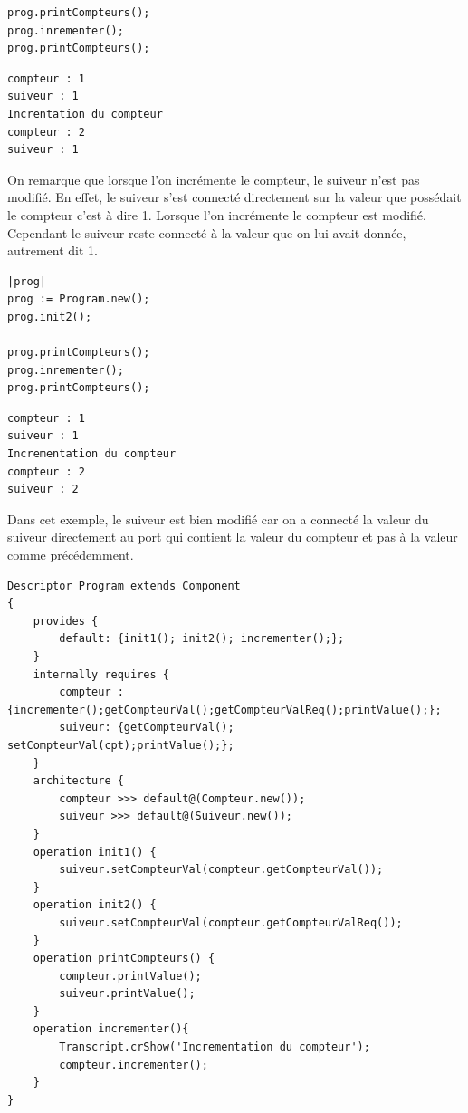 \documentclass[11pt,a4paper,openany,oneside]{book}
\begin{document}
\begin{appendices}
\begin{lstlisting}[language=Compo, frame=single, caption=Workspace (Retour classique)]
prog.printCompteurs();
prog.inrementer();
prog.printCompteurs();
\end{lstlisting}


\begin{lstlisting}[language=Compo, frame=single, caption=Output (Retour classique)]
compteur : 1
suiveur : 1
Increntation du compteur
compteur : 2
suiveur : 1
\end{lstlisting}

On remarque que lorsque l'on incrémente le compteur, le suiveur n'est pas modifié. En effet, le suiveur s'est connecté directement sur la valeur que possédait le compteur c'est à dire 1. Lorsque l'on incrémente le compteur est modifié. Cependant le suiveur reste connecté à la valeur que on lui avait donnée, autrement dit 1.

\begin{lstlisting}[language=Compo, frame=single, caption=Output (Retour par requis)]
|prog|
prog := Program.new();
prog.init2();

prog.printCompteurs();
prog.inrementer();
prog.printCompteurs();
\end{lstlisting}

\begin{lstlisting}[language=Compo, frame=single, caption=Output (Retour par requis)]
compteur : 1
suiveur : 1
Incrementation du compteur
compteur : 2
suiveur : 2
\end{lstlisting}

Dans cet exemple, le suiveur est bien modifié car on a connecté la valeur du suiveur directement au port qui contient la valeur du compteur et pas à la valeur comme précédemment.


\clearpage

\begin{lstlisting}[language=Compo, frame=single, caption=Le programme]
Descriptor Program extends Component
{
	provides {
		default: {init1(); init2(); incrementer();};
	}
	internally requires {
		compteur : {incrementer();getCompteurVal();getCompteurValReq();printValue();};
		suiveur: {getCompteurVal(); setCompteurVal(cpt);printValue();};
	}
	architecture {
	    compteur >>> default@(Compteur.new());
	    suiveur >>> default@(Suiveur.new());
	}
	operation init1() {
    	suiveur.setCompteurVal(compteur.getCompteurVal());
	}
	operation init2() {
        suiveur.setCompteurVal(compteur.getCompteurValReq());
	}
	operation printCompteurs() {
        compteur.printValue();
        suiveur.printValue();
	}
	operation incrementer(){
        Transcript.crShow('Incrementation du compteur');
        compteur.incrementer();
	}
}
\end{lstlisting}


\end{appendices}
\end{document}
